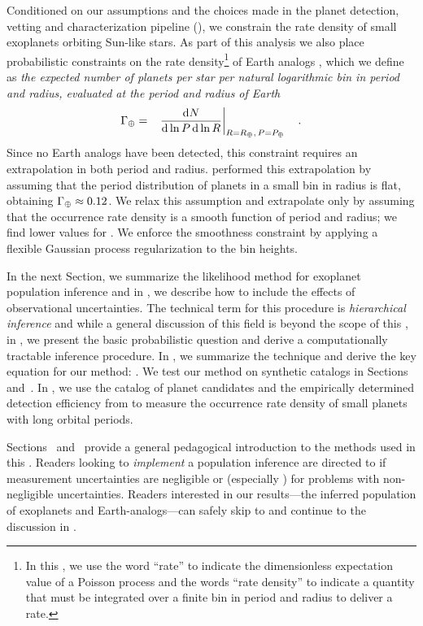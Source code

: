 Conditioned on our assumptions and the choices made in the planet detection,
vetting and characterization pipeline (\citealt{Petigura:2013a, Petigura:2013}), we
constrain the rate density of small exoplanets orbiting Sun-like stars.
As part of this analysis we also place probabilistic constraints on the rate
density\footnote{In this \paper, we use the word ``rate'' to indicate the
dimensionless expectation value of a Poisson process and the words ``rate
density'' to indicate a quantity that must be integrated over a finite bin in
period and radius to deliver a rate.} of Earth analogs \gammaearth, which we
define as \emph{the expected number of planets per star per natural
logarithmic bin in period and radius, evaluated at the period and radius of
Earth}
\begin{eqnarray}
{\ensuremath{\Gamma_\oplus}} &=&
\left.\frac{\mathrm{d} N}{\mathrm{d}\ln P\,\mathrm{d}\ln R}\right|
_{R=R_\oplus,\,P=P_\oplus}\quad.
\end{eqnarray}
Since no Earth analogs have been detected, this constraint requires an
extrapolation in both period and radius.
\citet{Petigura:2013} performed this extrapolation by assuming that the period
distribution of planets in a small bin in radius is flat, obtaining
${\Gamma_\oplus} \approx 0.12$.
We relax this assumption and extrapolate only by assuming that the occurrence
rate density is a smooth function of period and radius; we find lower values
for \gammaearth.
We enforce the smoothness constraint by applying a flexible Gaussian process
regularization to the bin heights.

In the next Section, we summarize the likelihood method for exoplanet
population inference and in , we describe how to include the
effects of observational uncertainties.
The technical term for this procedure is \emph{hierarchical inference} and
while a general discussion of this field is beyond the scope of this \paper,
in , we present the basic probabilistic question and derive a
computationally tractable inference procedure.
In , we summarize the technique and derive the key equation for
our method: .
We test our method on synthetic catalogs in Sections~
and~.
In , we use the catalog of planet candidates and the empirically
determined detection efficiency from \citet{Petigura:2013} to measure the
occurrence rate density of small planets with long orbital periods.

Sections~ and~ provide a general pedagogical
introduction to the methods used in this \paper.
Readers looking to \emph{implement} a population inference are directed to
 if measurement uncertainties are negligible or 
(especially ) for problems with non-negligible uncertainties.
Readers interested in our results---the inferred population of exoplanets and
Earth-analogs---can safely skip to  and continue to the discussion
in .


